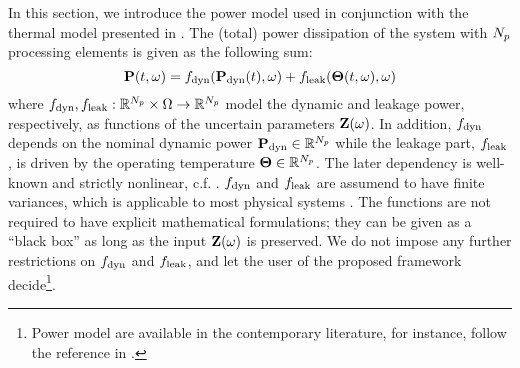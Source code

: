 In this section, we introduce the power model used in conjunction with the thermal model presented in . The (total) power dissipation of the system with ${N_p}$ processing elements is given as the following sum:
\begin{equation} \elabel{power-model}
  \vP(\t, \o) = f_\dyn(\vP_\dyn(\t), \o) + f_\leak(\vTO(\t, \o), \o)
\end{equation}
where $f_{\text{dyn}}, f_{\text{leak}}: \mathbb{R}^{N_p} \times \Omega \to \mathbb{R}^{N_p}$ model the dynamic and leakage power, respectively, as functions of the uncertain parameters $\mathbf{Z}(\omega)$. In addition, $f_{\text{dyn}}$ depends on the nominal dynamic power $\mathbf{P}_{\text{dyn}} \in \mathbb{R}^{N_p}$ while the leakage part, $f_{\text{leak}}$, is driven by the operating temperature ${\boldsymbol\Theta} \in \mathbb{R}^{N_p}$. The later dependency is well-known and strictly nonlinear, c.f. \cite{srivastava2010, liu2007}. $f_{\text{dyn}}$ and $f_{\text{leak}}$ are assumend to have finite variances, which is applicable to most physical systems \cite{xiu2002}. The functions are not required to have explicit mathematical formulations; they can be given as a ``black box'' as long as the input $\mathbf{Z}(\omega)$ is preserved. We do not impose any further restrictions on $f_{\text{dyn}}$ and $f_{\text{leak}}$, and let the user of the proposed framework decide\footnote{Power model are available in the contemporary literature, for instance, follow the reference in \cite{srivastava2010}.}.
